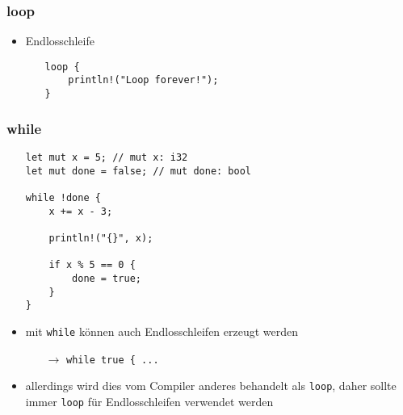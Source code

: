 \documentclass[a4paper,12pt]{article}
\begin{document}
\subsubsection*{loop}
\begin{itemize}
  \item Endlosschleife
  \begin{itemize}
  \item[]
\begin{verbatim}
loop {
    println!("Loop forever!");
}
\end{verbatim} 
  \end{itemize}
\end{itemize}
\subsubsection*{while}
\begin{itemize}
  \item[]
\begin{verbatim}
let mut x = 5; // mut x: i32
let mut done = false; // mut done: bool

while !done {
    x += x - 3;

    println!("{}", x);

    if x % 5 == 0 {
        done = true;
    }
}
\end{verbatim}
	\item mit \verb|while| können auch Endlosschleifen erzeugt werden 
	\begin{itemize}
	    \item[$\rightarrow$] \verb|while true { ...| 
	\end{itemize}
	\item allerdings wird dies vom Compiler anderes behandelt als \verb|loop|, daher sollte immer \verb|loop| für Endlosschleifen verwendet werden
\end{itemize}
\end{document}
